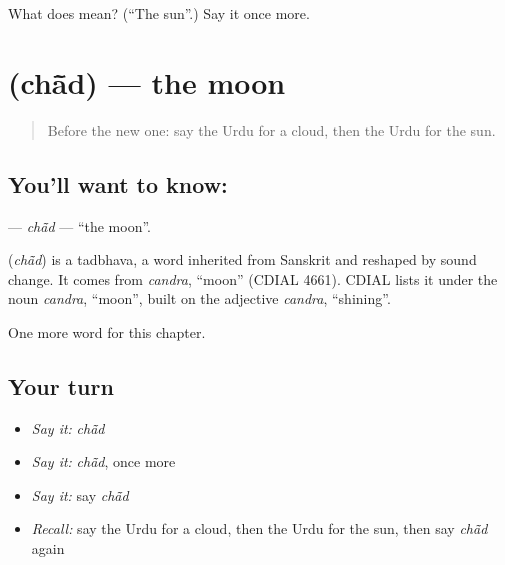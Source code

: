 \begin{tcolorbox}[breakable,colback=teal!4,colframe=teal!35!black,title={Before you move on}]
What does  mean? (\textquotedblleft{}The sun\textquotedblright{}.) Say it once more.
\end{tcolorbox}
\section[\texorpdfstring{\ur{چاند} (chā̃d)}{چاند (chā̃d)}]{ (chā̃d) — the moon}

\label{lesson:UR-C66-chad}



\begin{quote}
Before the new one: say the Urdu for a cloud, then the Urdu for the sun.
\end{quote}

\subsection*{You'll want to know: }
\textbf{} — \emph{chā̃d} — \textquotedblleft{}the moon\textquotedblright{}.

\begin{cousinweb}
\textbf{} (\emph{chā̃d}) is a tadbhava, a word inherited from Sanskrit and reshaped by sound change. It comes from \emph{candra}, \textquotedblleft{}moon\textquotedblright{} (CDIAL 4661). CDIAL lists it under the noun \emph{candra}, \textquotedblleft{}moon\textquotedblright{}, built on the adjective \emph{candra}, \textquotedblleft{}shining\textquotedblright{}.
\end{cousinweb}

\begin{grammarlens}[title={What you've built}]
One more word for this chapter.
\end{grammarlens}

\subsection*{Your turn}
\begin{itemize}
\raggedright
  \item \emph{Say it:} \emph{chā̃d}
  \item \emph{Say it:} \emph{chā̃d}, once more
  \item \emph{Say it:} say \emph{chā̃d}
  \item \emph{Recall:} say the Urdu for a cloud, then the Urdu for the sun, then say \emph{chā̃d} again
\end{itemize}

